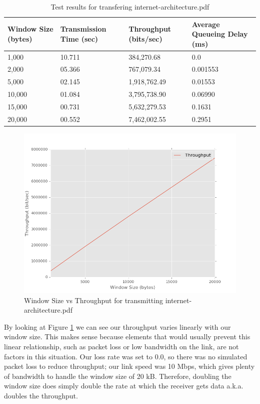 \documentclass[11pt]{article}
\begin{document}
\begin{table}[H]
\begin{center}
\caption{Test results for transfering internet-architecture.pdf}
\label{tblexper}
\begin{tabular}{llll}
  \toprule
  Window Size (bytes) & Transmission Time (sec) & Throughput (bits/sec) & Average Queueing Delay (ms) \\
  \midrule
  1,000 & 10.711 & 384,270.68 & 0.0 \\
  2,000 & 05.366 & 767,079.34 & 0.001553 \\
  5,000 & 02.145 & 1,918,762.49 & 0.01553 \\
  10,000 & 01.084 & 3,795,738.90 & 0.06990 \\
  15,000 & 00.731 & 5,632,279.53 & 0.1631 \\
  20,000 & 00.552 & 7,462,002.55 & 0.2951 \\
  \bottomrule
\end{tabular}
\end{center}
\end{table}

\begin{figure}[H]
\caption{Window Size vs Throughput for transmitting internet-architecture.pdf}
\label{throughput}
  \centering
  \includegraphics[width=15cm]{throughput}
\end{figure}

By looking at Figure \ref{throughput} we can see our throughput varies linearly with our window size. This makes sense because elements that would usually prevent this linear relationship, such as packet loss or low bandwidth on the link, are not factors in this situation. Our loss rate was set to 0.0, so there was no simulated packet loss to reduce throughput; our link speed was 10 Mbps, which gives plenty of bandwidth to handle the window size of 20 kB. Therefore, doubling the window size does simply double the rate at which the receiver gets data a.k.a. doubles the throughput.
\end{document}
